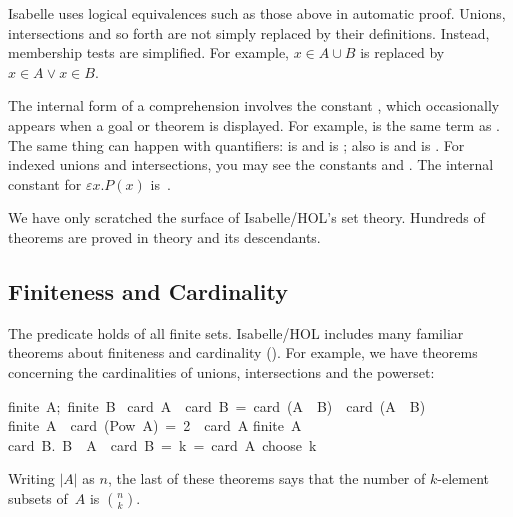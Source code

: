 Isabelle uses logical equivalences such as those above in automatic proof. 
Unions, intersections and so forth are not simply replaced by their
definitions.  Instead, membership tests are simplified.  For example,  $x\in
A\cup B$ is replaced by $x\in A\vee x\in B$.

The internal form of a comprehension involves the constant  
,
which occasionally appears when a goal or theorem
is displayed.  For example,   is the same term as
.  The same thing can
happen with quantifiers:   \hbox{}
is 
 and 
\hbox{} is ; 
also  is 
 and 
 is 
.  For indexed unions and
intersections, you may see the constants 
 and  \@.
The internal constant for $\varepsilon x.P(x)$ is~.

We have only scratched the surface of Isabelle/HOL's set theory. 
Hundreds of theorems are proved in theory  and its
descendants.


\subsection{Finiteness and Cardinality}

%
The predicate  holds of all finite sets.  Isabelle/HOL
includes many familiar theorems about finiteness and cardinality 
(). For example, we have theorems concerning the
cardinalities of unions, intersections and the
powerset:
%
\begin{isabelle}
{\isasymlbrakk}finite\ A;\ finite\ B\isasymrbrakk\isanewline
\isasymLongrightarrow\ card\ A\ \isacharplus\ card\ B\ =\ card\ (A\ \isasymunion\ B)\ \isacharplus\ card\ (A\ \isasyminter\ B)
%
\isanewline
\isanewline
finite\ A\ \isasymLongrightarrow\ card\
(Pow\ A)\  =\ 2\ \isacharcircum\ card\ A%
%
\isanewline
\isanewline
finite\ A\ \isasymLongrightarrow\isanewline
card\ \isacharbraceleft B.\ B\ \isasymsubseteq\
A\ \isasymand\ card\ B\ =\
k\isacharbraceright\ =\ card\ A\ choose\ k%
\rulename{n_subsets}
\end{isabelle}
Writing $|A|$ as $n$, the last of these theorems says that the number of
$k$-element subsets of~$A$ is 
$\binom{n}{k}$.

